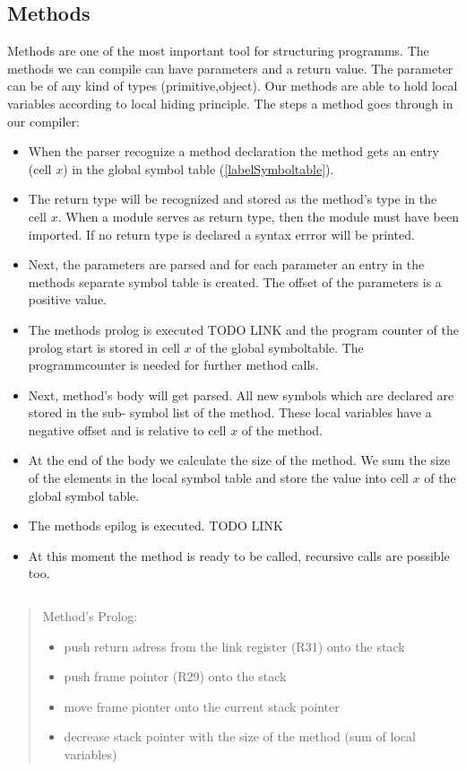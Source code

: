 \subsection{Methods}
Methods are one of the most important tool for structuring programms. The methods we can compile can have parameters and a return value. The
parameter can be of any kind of types (primitive,object). Our methods are able to hold local variables according to local hiding principle.
The steps a method goes through in our compiler:
\begin{itemize}
  \item When the parser recognize a method declaration the method gets an entry (cell $x$) in the global symbol table (\ref{labelSymboltable}).
  \item The return type will be recognized and stored as the method's type in the cell $x$. When a module serves as return
  type, then the module must have been imported. If no return type is declared a syntax errror will be printed.
  \item Next, the parameters are parsed and for each parameter an entry in the methods separate symbol table is created. The offset of the
  parameters is a positive value. 
  \item The methods prolog is executed  TODO LINK and the program counter of the prolog start is stored in cell $x$ of the global
  symboltable. The programmcounter is needed for further method calls. 
  \item Next, method's body will get parsed. All new symbols which are declared are stored in the sub- symbol list of the method. These
  local variables have a negative offset and is relative to cell $x$ of the method.
  \item At the end of the body we calculate the size of the method. We sum the size of the elements in the local symbol table and
  store the value into cell $x$ of the global symbol table.
  \item The methods epilog is executed. TODO LINK
  \item At this moment the method is ready to be called, recursive calls are possible too.
\end{itemize}
\begin{verbatim}

\end{verbatim}
\begin{quote}
Method's Prolog: \\
\begin{itemize}
  \item push return adress from the link register (R31) onto the stack
  \item push frame pointer (R29) onto the stack
  \item move frame pionter onto the current stack pointer
  \item decrease stack pointer with the size of the method (sum of local variables) 
\end{itemize}
\end{quote}
\begin{verbatim}

\end{verbatim}

